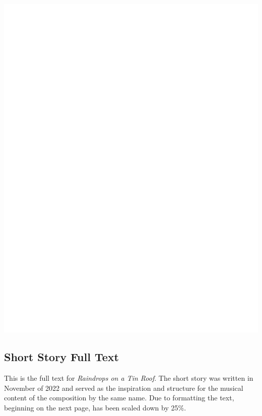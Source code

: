 \begin{center}
     \includegraphics[scale=0.75]{Scores/raindrops_Part23.pdf}
\end{center}
\newpage



\subsection{Short Story Full Text}

This is the full text for \textit{Raindrops on a Tin Roof}. The short story was written in November of 2022 and served as the inspiration and structure for the musical content of the composition by the same name. Due to formatting the text, beginning on the next page, has been scaled down by 25\%.

